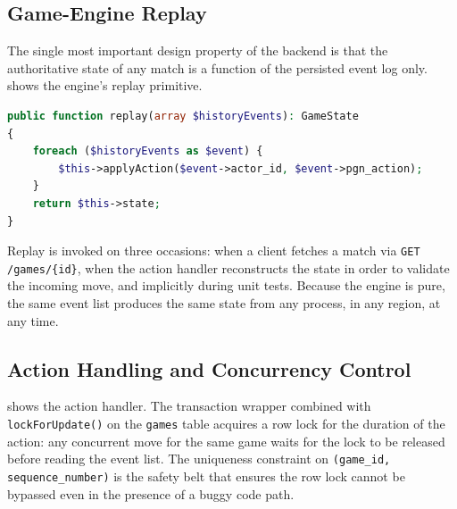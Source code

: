\documentclass{scrartcl}
\begin{document}
\subsection{Game-Engine Replay}

The single most important design property of the backend is that the
authoritative state of any match is a function of the persisted event
log only.  shows the engine's replay primitive.

\begin{lstlisting}[language=PHP,caption={Deterministic replay loop. The
engine is seeded from the game's seed, then each persisted event is
applied in order; the engine's output is the canonical \texttt{GameState}.},label={lst:engine-replay}]
public function replay(array $historyEvents): GameState
{
    foreach ($historyEvents as $event) {
        $this->applyAction($event->actor_id, $event->pgn_action);
    }
    return $this->state;
}
\end{lstlisting}

Replay is invoked on three occasions: when a client fetches a match
via \texttt{GET /games/\{id\}}, when the action handler reconstructs
the state in order to validate the incoming move, and implicitly during
unit tests. Because the engine is pure, the same event list produces
the same state from any process, in any region, at any time.

\subsection{Action Handling and Concurrency Control}

 shows the action handler. The transaction
wrapper combined with \texttt{lockForUpdate()} on the \texttt{games}
table acquires a row lock for the duration of the action: any
concurrent move for the same game waits for the lock to be released
before reading the event list. The uniqueness constraint on
\texttt{(game\_id, sequence\_number)} is the safety belt that ensures
the row lock cannot be bypassed even in the presence of a buggy code
path.
\end{document}
